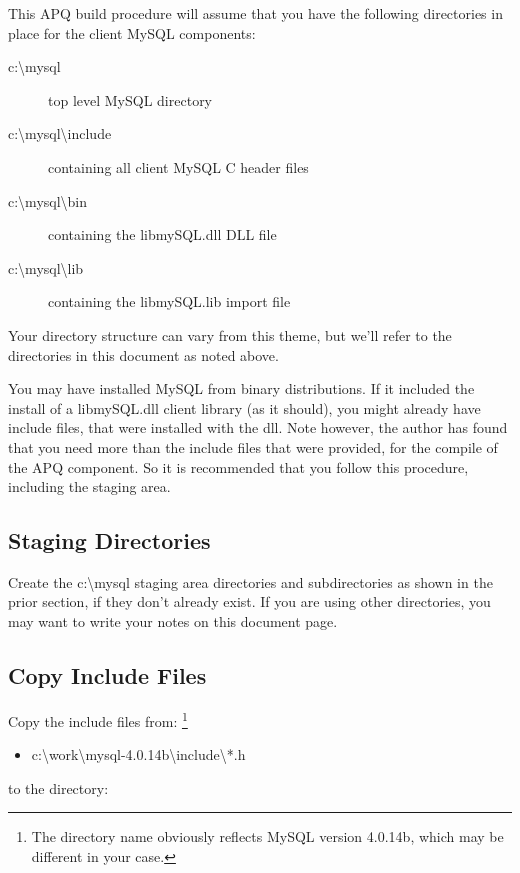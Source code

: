 \documentclass[english]{report}
\begin{document}
This APQ build procedure will assume that you have the following directories
in place for the client MySQL components:

\begin{description}
\item [c:\textbackslash{}mysql]top level MySQL directory
\item [c:\textbackslash{}mysql\textbackslash{}include]containing all client
MySQL C header files
\item [c:\textbackslash{}mysql\textbackslash{}bin]containing the libmySQL.dll
DLL file
\item [c:\textbackslash{}mysql\textbackslash{}lib]containing the libmySQL.lib
import file
\end{description}
Your directory structure can vary from this theme, but we'll refer
to the directories in this document as noted above.

You may have installed MySQL from binary distributions. If it included
the install of a libmySQL.dll client library (as it should), you might
already have include files, that were installed with the dll. Note
however, the author has found that you need more than the include
files that were provided, for the compile of the APQ component. So
it is recommended that you follow this procedure, including the staging
area.


\subsection{Staging Directories}

Create the c:\textbackslash{}mysql staging area directories and subdirectories
as shown in the prior section, if they don't already exist. If you
are using other directories, you may want to write your notes on this
document page.


\subsection{Copy Include Files}

Copy the include files from:%
\footnote{The directory name obviously reflects MySQL version 4.0.14b, which
may be different in your case.%
}

\begin{itemize}
\item c:\textbackslash{}work\textbackslash{}mysql-4.0.14b\textbackslash{}include\textbackslash{}{*}.h
\end{itemize}
to the directory:
\end{document}
